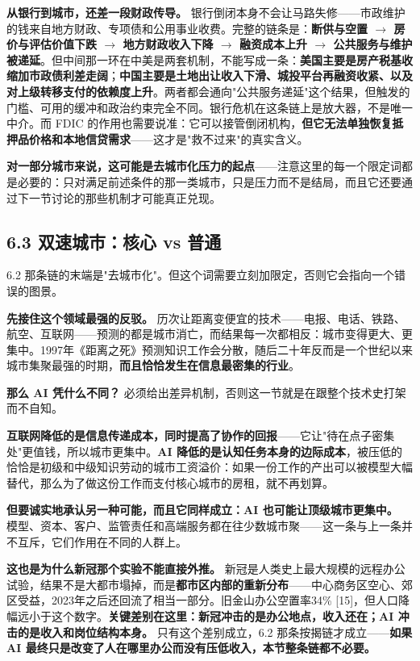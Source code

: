 \documentclass[11pt,a4paper]{ctexart}
\begin{document}
\textbf{从银行到城市，还差一段财政传导。} 银行倒闭本身不会让马路失修——市政维护的钱来自地方财政、专项债和公用事业收费。完整的链条是：\textbf{断供与空置 $\to$ 房价与评估价值下跌 $\to$ 地方财政收入下降 $\to$ 融资成本上升 $\to$ 公共服务与维护被递延}。但中间那一环在中美是两套机制，不能写成一条：\textbf{美国主要是房产税基收缩加市政债利差走阔}；\textbf{中国主要是土地出让收入下滑、城投平台再融资收紧、以及对上级转移支付的依赖度上升}。两者都会通向"公共服务递延"这个结果，但触发的门槛、可用的缓冲和政治约束完全不同。银行危机在这条链上是放大器，不是唯一中介。而 FDIC 的作用也需要说准：它可以接管倒闭机构，\textbf{但它无法单独恢复抵押品价格和本地信贷需求}——这才是"救不过来"的真实含义。

\textbf{对一部分城市来说，这可能是去城市化压力的起点}——注意这里的每一个限定词都是必要的：只对满足前述条件的那一类城市，只是压力而不是结局，而且它还要通过下一节讨论的那些机制才可能真正兑现。

\subsection{6.3 双速城市：核心 vs 普通}

6.2 那条链的末端是"去城市化"。但这个词需要立刻加限定，否则它会指向一个错误的图景。

\textbf{先接住这个领域最强的反驳。} 历次让距离变便宜的技术——电报、电话、铁路、航空、互联网——预测的都是城市消亡，而结果每一次都相反：城市变得更大、更集中。1997年《距离之死》预测知识工作会分散，随后二十年反而是一个世纪以来城市集聚最强的时期，\textbf{而且恰恰发生在信息最密集的行业}。

\textbf{那么 AI 凭什么不同？} 必须给出差异机制，否则这一节就是在跟整个技术史打架而不自知。

\textbf{互联网降低的是信息传递成本，同时提高了协作的回报}——它让"待在点子密集处"更值钱，所以城市更集中。\textbf{AI 降低的是认知任务本身的边际成本}，被压低的恰恰是初级和中级知识劳动的城市工资溢价：如果一份工作的产出可以被模型大幅替代，那么为了做这份工作而支付核心城市的房租，就不再划算。

\textbf{但要诚实地承认另一种可能，而且它同样成立：AI 也可能让顶级城市更集中。} 模型、资本、客户、监管责任和高端服务都在往少数城市聚——这一条与上一条并不互斥，它们作用在不同的人群上。

\textbf{这也是为什么新冠那个实验不能直接外推。} 新冠是人类史上最大规模的远程办公试验，结果不是大都市塌掉，而是\textbf{都市区内部的重新分布}——中心商务区空心、郊区受益，2023年之后还回流了相当一部分。旧金山办公空置率34\% [15]，但人口降幅远小于这个数字。\textbf{关键差别在这里：新冠冲击的是办公地点，收入还在；AI 冲击的是收入和岗位结构本身。} 只有这个差别成立，6.2 那条按揭链才成立——\textbf{如果 AI 最终只是改变了人在哪里办公而没有压低收入，本节整条链都不必要。}
\end{document}
